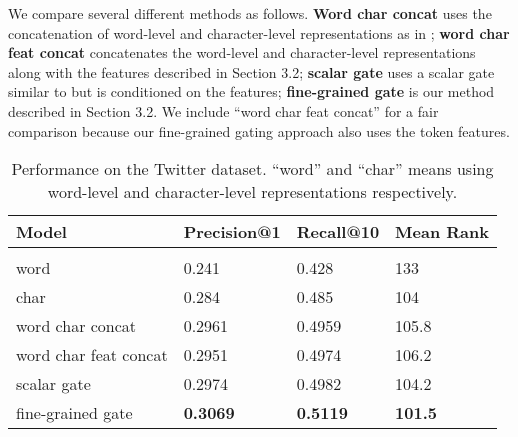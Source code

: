 \documentclass{article} \usepackage{iclr2017_conference,times}
\begin{document}
We compare several different methods as follows.
\textbf{Word char concat} uses the concatenation of word-level and character-level representations as in \cite{yang2016multi}; \textbf{word char feat concat} concatenates the word-level and character-level representations along with the features described in Section 3.2; \textbf{scalar gate} uses a scalar gate similar to \cite{miyamoto2016gated} but is conditioned on the features; \textbf{fine-grained gate} is our method described in Section 3.2. We include “word char feat concat” for a fair comparison because our fine-grained gating approach also uses the token features.

\begin{table}[t]
\caption{\small Performance on the Twitter dataset. ``word'' and ``char'' means using word-level and character-level representations respectively.}
\label{tab:twitter}
\begin{center}
\begin{tabular}{llll}
Model & Precision@1 & Recall@10 & Mean Rank
\\ \hline \\
word \citep{dhingra2016tweet2vec} & 0.241 & 0.428 & 133 \\
char \citep{dhingra2016tweet2vec} & 0.284 & 0.485 & 104 \\
word char concat & 0.2961 & 0.4959 & 105.8 \\
word char feat concat & 0.2951 & 0.4974 & 106.2 \\
scalar gate & 0.2974 & 0.4982 & 104.2 \\
fine-grained gate & \textbf{0.3069} & \textbf{0.5119} & \textbf{101.5}
\end{tabular}
\end{center}
\end{table}
\end{document}
